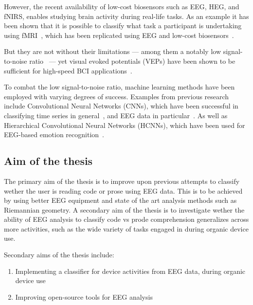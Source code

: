 \documentclass[a4paper]{article}
\begin{document}
\begin{refsection}
    However, the recent availability of low-cost biosensors such as EEG, HEG, and fNIRS, enables studying brain activity during real-life tasks. As an example it has been shown that it is possible to classify what task a participant is undertaking using fMRI~\cite{floyd_decoding_2017}, which has been replicated using EEG and low-cost biosensors~\cite{fucci_replication_2019}.

    But they are not without their limitations --- among them a notably low signal-to-noise ratio~\cite{mcfarland_eeg-based_2017} --- yet visual evoked potentials (VEPs) have been shown to be sufficient for high-speed BCI applications~\cite{spuler_high-speed_2017}.

    To combat the low signal-to-noise ratio, machine learning methods have been employed with varying degrees of success. Examples from previous research include Convolutional Neural Networks (CNNs), which have been successful in classifying time series in general~\cite{zhao_convolutional_2017}, and EEG data in particular~\cite{schirrmeister_deep_2017}. As well as Hierarchical Convolutional Neural Networks (HCNNs), which have been used for EEG-based emotion recognition~\cite{li_hierarchical_2018}.




\subsection{Aim of the thesis}

    The primary aim of the thesis is to improve upon previous attempts\cite{fucci_replication_2019} to classify wether the user is reading code or prose using EEG data. This is to be achieved by using better EEG equipment and state of the art analysis methods such as Riemannian geometry. A secondary aim of the thesis is to investigate wether the ability of EEG analysis to classify code vs prode comprehension generalizes across more activities, such as the wide variety of tasks engaged in during organic device use.

    Secondary aims of the thesis include:

    \begin{enumerate}
        \item Implementing a classifier for device activities from EEG data, during organic device use
        \item Improving open-source tools for EEG analysis
    \end{enumerate}


\end{refsection}
\end{document}
